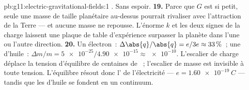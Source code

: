 \begin{solution}{pb:g11:electric-gravitational-fields:1}
. Sans espoir.
\textbf{19.} Parce que $G$ est si petit, seule une masse de taille
planétaire au-dessus pourrait rivaliser avec l'attraction de la
Terre --- et aucune masse ne repousse. L'énorme $k$ et les deux signes
de la charge laissent une plaque de table d'expérience surpasser la
planète dans l'une ou l'autre direction.
\textbf{20.} Un électron~: $\Delta\abs{q}/\abs{q} = e/3e \approx 33\,\%$~;
une  d'huile~:
$\Delta m/m = \num{5e-25} / \num{4.90e-15} \approx \num{e-10}$.
L'escalier de charge déplace la
tension d'équilibre de centaines de
~; l'escalier de masse est
invisible à toute tension. L'équilibre
résout donc l' de
l'électricité --- $e = \qty{1.60e-19}{C}$ --- tandis que les
 d'huile se fondent en un
continuum.
\end{solution}
